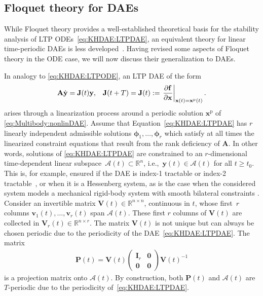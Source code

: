 \documentclass[a4paper, nonatbib, 3p, twocolumn]{elsarticle}
\theoremstyle{plain}
\theoremstyle{definition}
\theoremstyle{remark}
\newcommand{\pd}[2]{\frac{\partial #1}{\partial #2}}
\newcommand{\dy}{\dot{\vy}}
\newcommand{\vzero}{\mathbf{0}}
\newcommand{\Rspace}{\mathbb{R}}
\newcommand{\rp}{\mathrm p}
\newcommand{\vvph}{\bm{\phi}}
\newcommand{\vf}{\mathbf f}
\newcommand{\vv}{\mathbf v}
\newcommand{\vx}{\mathbf x}
\newcommand{\vy}{\mathbf y}
\newcommand{\vA}{\mathbf A}
\newcommand{\vI}{\mathbf I}
\newcommand{\vJ}{\mathbf J}
\newcommand{\vP}{\mathbf P}
\newcommand{\vV}{\mathbf V}
\newcommand{\cA}{\mathcal{A}}
\begin{document}
\subsection{Floquet theory for DAEs}\label{sec:floquetDAE}
While Floquet theory provides a well-established theoretical basis for the stability analysis of LTP ODEs~\eqref{eq:KHDAE:LTPDAE}, an equivalent theory for linear time-periodic DAEs is less developed~\cite{Lamour1998,Lamour2003}. 
Having revised some aspects of Floquet theory in the ODE case, we will now discuss their generalization to DAEs.

In analogy to \eqref{eq:KHDAE:LTPODE}, an LTP DAE of the form 
\begin{equation}\label{eq:KHDAE:LTPDAE}
    \vA\dy = \vJ(t)\vy\textnormal{,}\quad \vJ(t+T) = \vJ(t):= \left.\pd{\vf}{\vx}\right|_{\vx(t)=\vx^\rp(t)}\textnormal{.}
\end{equation}
arises through a linearization process around a periodic solution $\vx^\rp$ of  \eqref{eq:Multibody:nonlinDAE}.
Assume that Equation~\eqref{eq:KHDAE:LTPDAE} has $r$ linearly independent admissible solutions $\vvph_1, \dots, \vvph_r$ which satisfy at all times the linearized constraint equations that result from the rank deficiency of $\vA$. In other words, solutions of \eqref{eq:KHDAE:LTPDAE} are constrained to an $r$-dimensional time-dependent linear subspace~$\cA(t)\subset \Rspace^n$, i.e.,~$\vy(t)\in\cA(t)$ for all $ t \geq t_0$.
This is, for example, ensured if the DAE is index-1 tractable or index-2 tractable~\cite{Griepentrog1986}, or when it is a Hessenberg system, as is the case when the considered system models a mechanical rigid-body system with smooth bilateral constraints \cite{Lamour2003}. Consider an invertible matrix $\vV(t) \in \Rspace^{n \times n}$, continuous in $t$, whose first~$r$ columns $\vv_1(t), \dots, \vv_r(t)$ span $\cA(t)$. These first $r$ columns of $\vV(t)$ are collected in $\vV_{r}(t) \in \Rspace^{n \times r}$. The matrix $\vV(t)$ is not unique but can always be chosen periodic due to the periodicity of the DAE~\eqref{eq:KHDAE:LTPDAE}. The matrix 
\begin{align}
    \vP(t) = \vV(t) \begin{pmatrix}
        \vI_r & \vzero \\ \vzero & \vzero
    \end{pmatrix} \vV(t)^{-1}
\end{align}
is a projection matrix onto $\cA(t)$. 
By construction, both $\vP(t)$ and $\cA(t)$ are $T$-periodic due to the periodicity of~\eqref{eq:KHDAE:LTPDAE}.
\end{document}
